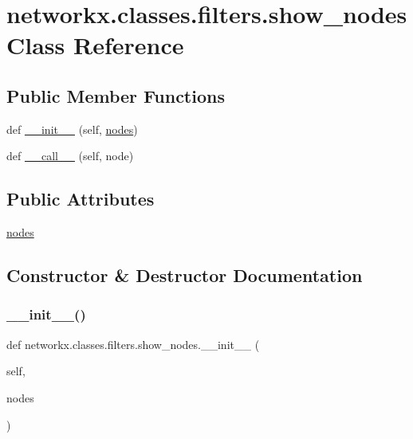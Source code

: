 \hypertarget{classnetworkx_1_1classes_1_1filters_1_1show__nodes}{}\section{networkx.\+classes.\+filters.\+show\+\_\+nodes Class Reference}
\label{classnetworkx_1_1classes_1_1filters_1_1show__nodes}
\subsection*{Public Member Functions}
\begin{DoxyCompactItemize}
\item 
def \hyperlink{classnetworkx_1_1classes_1_1filters_1_1show__nodes_ad27ccc4949e46973a6b070187777827b}{\+\_\+\+\_\+init\+\_\+\+\_\+} (self, \hyperlink{classnetworkx_1_1classes_1_1filters_1_1show__nodes_adc68e337b5417adb30d4e5b15d224c4f}{nodes})
\item 
def \hyperlink{classnetworkx_1_1classes_1_1filters_1_1show__nodes_a070fcac08f8a32986daeda302d66d706}{\+\_\+\+\_\+call\+\_\+\+\_\+} (self, node)
\end{DoxyCompactItemize}
\subsection*{Public Attributes}
\begin{DoxyCompactItemize}
\item 
\hyperlink{classnetworkx_1_1classes_1_1filters_1_1show__nodes_adc68e337b5417adb30d4e5b15d224c4f}{nodes}
\end{DoxyCompactItemize}


\subsection{Constructor \& Destructor Documentation}
\mbox{\label{classnetworkx_1_1classes_1_1filters_1_1show__nodes_ad27ccc4949e46973a6b070187777827b}} 
\subsubsection{\texorpdfstring{\+\_\+\+\_\+init\+\_\+\+\_\+()}{\_\_init\_\_()}}
{\footnotesize\ttfamily def networkx.\+classes.\+filters.\+show\+\_\+nodes.\+\_\+\+\_\+init\+\_\+\+\_\+ (\begin{DoxyParamCaption}\item[{}]{self,  }\item[{}]{nodes }\end{DoxyParamCaption})}



